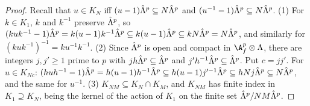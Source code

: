 \begin{proof}
Recall that $u\in K_N$ iff $(u-1)\hat\Lambda^{p}\subseteq N\hat\Lambda^{p}$ and $(u^{-1}-1)\hat\Lambda^{p}\subseteq
N\hat\Lambda^{p}$. (1) For $k\in K_1$, $k$ and $k^{-1}$ preserve $\hat\Lambda^{p}$, so
$(kuk^{-1}-1)\hat\Lambda^{p}=k(u-1)k^{-1}\hat\Lambda^{p}\subseteq k(u-1)\hat\Lambda^{p}\subseteq kN\hat\Lambda^{p}=
N\hat\Lambda^{p}$, and similarly for $(kuk^{-1})^{-1}=ku^{-1}k^{-1}$. (2) Since $\hat\Lambda^{p}$ is open and
compact in $\A_f^p\otimes\Lambda$, there are integers $j,j'\ge1$ prime to $p$ with
$jh\hat\Lambda^{p}\subseteq\hat\Lambda^{p}$ and $j'h^{-1}\hat\Lambda^{p}\subseteq\hat\Lambda^{p}$. Put $c=jj'$. For $u\in
K_{Nc}$: $(huh^{-1}-1)\hat\Lambda^{p}=h(u-1)h^{-1}\hat\Lambda^{p}\subseteq h(u-1)j'^{-1}\hat\Lambda^{p}\subseteq
hNj\hat\Lambda^{p}\subseteq N\hat\Lambda^{p}$, and the same for $u^{-1}$. (3) $K_{NM}\subseteq K_N\cap K_M$, and
$K_{NM}$ has finite index in $K_1\supseteq K_N$, being the kernel of the action of $K_1$ on the finite
set $\hat\Lambda^{p}/NM\hat\Lambda^{p}$.
\end{proof}


